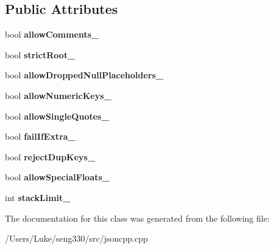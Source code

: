 \subsection*{Public Attributes}
\begin{DoxyCompactItemize}
\item 
\hypertarget{class_json_1_1_our_features_ac71bb7ba7363d3b05ed76602b036ce33}{}bool {\bfseries allow\+Comments\+\_\+}\label{class_json_1_1_our_features_ac71bb7ba7363d3b05ed76602b036ce33}

\item 
\hypertarget{class_json_1_1_our_features_a2095f66a776c0a4ae6cc931a0c94242e}{}bool {\bfseries strict\+Root\+\_\+}\label{class_json_1_1_our_features_a2095f66a776c0a4ae6cc931a0c94242e}

\item 
\hypertarget{class_json_1_1_our_features_a13963bc44bf948eec1968f7ff8e8f5f1}{}bool {\bfseries allow\+Dropped\+Null\+Placeholders\+\_\+}\label{class_json_1_1_our_features_a13963bc44bf948eec1968f7ff8e8f5f1}

\item 
\hypertarget{class_json_1_1_our_features_af6973fc7e774ce2d634ba99442aeb91a}{}bool {\bfseries allow\+Numeric\+Keys\+\_\+}\label{class_json_1_1_our_features_af6973fc7e774ce2d634ba99442aeb91a}

\item 
\hypertarget{class_json_1_1_our_features_abbd6c196d7a22e2a360a59887eda4610}{}bool {\bfseries allow\+Single\+Quotes\+\_\+}\label{class_json_1_1_our_features_abbd6c196d7a22e2a360a59887eda4610}

\item 
\hypertarget{class_json_1_1_our_features_ae8ad25b90706c78f1a8fe929191ac61b}{}bool {\bfseries fail\+If\+Extra\+\_\+}\label{class_json_1_1_our_features_ae8ad25b90706c78f1a8fe929191ac61b}

\item 
\hypertarget{class_json_1_1_our_features_a39b8e0b86b1c24a45e800c023bb715aa}{}bool {\bfseries reject\+Dup\+Keys\+\_\+}\label{class_json_1_1_our_features_a39b8e0b86b1c24a45e800c023bb715aa}

\item 
\hypertarget{class_json_1_1_our_features_af760f91cc2a7af37e44f78fb466061bb}{}bool {\bfseries allow\+Special\+Floats\+\_\+}\label{class_json_1_1_our_features_af760f91cc2a7af37e44f78fb466061bb}

\item 
\hypertarget{class_json_1_1_our_features_a9a786713902d14be6d57a08cc03ccfff}{}int {\bfseries stack\+Limit\+\_\+}\label{class_json_1_1_our_features_a9a786713902d14be6d57a08cc03ccfff}

\end{DoxyCompactItemize}


The documentation for this class was generated from the following file\+:\begin{DoxyCompactItemize}
\item 
/\+Users/\+Luke/seng330/src/jsoncpp.\+cpp\end{DoxyCompactItemize}
